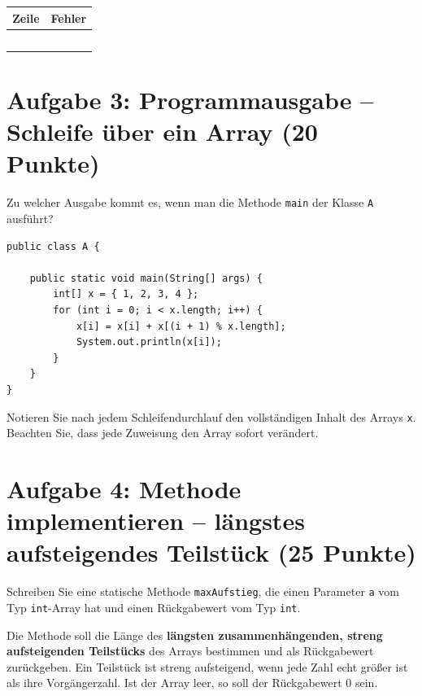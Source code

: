 \documentclass[
	fontsize=12pt,
	paper=a4,
	numbers=noenddot,
	parskip=half,
	openany
]{scrbook}
\begin{document}
\begin{center}
\begin{tabular}{|p{1.6cm}|p{10.5cm}|}
	\hline
	\textbf{Zeile} & \textbf{Fehler} \\ \hline
	& \\[2cm] \hline
	& \\[2cm] \hline
	& \\[2cm] \hline
	& \\[2cm] \hline
	& \\[2cm] \hline
\end{tabular}
\end{center}

\clearpage
\section*{Aufgabe 3: Programmausgabe -- Schleife über ein Array \hfill (20 Punkte)}

Zu welcher Ausgabe kommt es, wenn man die Methode \texttt{main} der Klasse \texttt{A} ausführt?

\begin{lstlisting}
public class A {

    public static void main(String[] args) {
        int[] x = { 1, 2, 3, 4 };
        for (int i = 0; i < x.length; i++) {
            x[i] = x[i] + x[(i + 1) % x.length];
            System.out.println(x[i]);
        }
    }
}
\end{lstlisting}

\begin{hinweis}[Empfehlung]
	Notieren Sie nach jedem Schleifendurchlauf den vollständigen Inhalt des Arrays \texttt{x}. Beachten Sie, dass jede Zuweisung den Array sofort verändert.
\end{hinweis}

\clearpage
\section*{Aufgabe 4: Methode implementieren -- längstes aufsteigendes Teilstück \hfill (25 Punkte)}

Schreiben Sie eine statische Methode \texttt{maxAufstieg}, die einen Parameter \texttt{a} vom Typ \texttt{int}-Array hat und einen Rückgabewert vom Typ \texttt{int}.

Die Methode soll die Länge des \textbf{längsten zusammenhängenden, streng aufsteigenden Teilstücks} des Arrays bestimmen und als Rückgabewert zurückgeben. Ein Teilstück ist streng aufsteigend, wenn jede Zahl echt größer ist als ihre Vorgängerzahl. Ist der Array leer, so soll der Rückgabewert $0$ sein.
\end{document}
